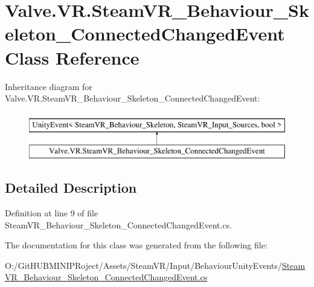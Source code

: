 \hypertarget{class_valve_1_1_v_r_1_1_steam_v_r___behaviour___skeleton___connected_changed_event}{}\section{Valve.\+V\+R.\+Steam\+V\+R\+\_\+\+Behaviour\+\_\+\+Skeleton\+\_\+\+Connected\+Changed\+Event Class Reference}
\label{class_valve_1_1_v_r_1_1_steam_v_r___behaviour___skeleton___connected_changed_event}
Inheritance diagram for Valve.\+V\+R.\+Steam\+V\+R\+\_\+\+Behaviour\+\_\+\+Skeleton\+\_\+\+Connected\+Changed\+Event\+:\begin{figure}[H]
\begin{center}
\leavevmode
\includegraphics[height=2.000000cm]{class_valve_1_1_v_r_1_1_steam_v_r___behaviour___skeleton___connected_changed_event}
\end{center}
\end{figure}


\subsection{Detailed Description}


Definition at line 9 of file Steam\+V\+R\+\_\+\+Behaviour\+\_\+\+Skeleton\+\_\+\+Connected\+Changed\+Event.\+cs.



The documentation for this class was generated from the following file\+:\begin{DoxyCompactItemize}
\item 
O\+:/\+Git\+H\+U\+B\+M\+I\+N\+I\+P\+Roject/\+Assets/\+Steam\+V\+R/\+Input/\+Behaviour\+Unity\+Events/\mbox{\hyperlink{_steam_v_r___behaviour___skeleton___connected_changed_event_8cs}{Steam\+V\+R\+\_\+\+Behaviour\+\_\+\+Skeleton\+\_\+\+Connected\+Changed\+Event.\+cs}}\end{DoxyCompactItemize}
